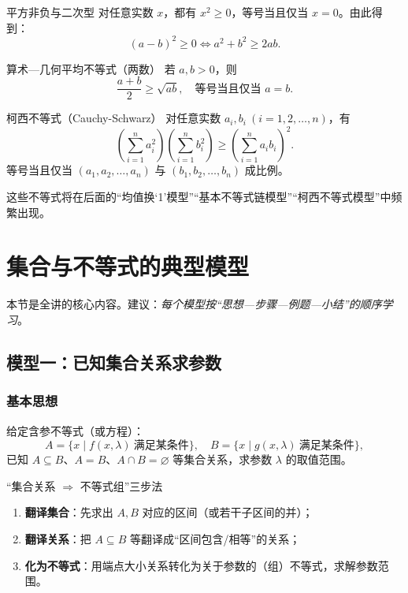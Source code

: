 \documentclass[a4paper,11pt]{ctexart}
\begin{document}
\begin{theorembox}{平方非负与二次型}
对任意实数 $x$，都有 $x^2\ge 0$，等号当且仅当 $x=0$。由此得到：
\[
(a-b)^2\ge 0\iff a^2+b^2\ge 2ab.
\]
\end{theorembox}

\begin{theorembox}{算术—几何平均不等式（两数）}
若 $a,b>0$，则
\[
\frac{a+b}{2}\ge\sqrt{ab},\quad
\text{等号当且仅当 } a=b.
\]
\end{theorembox}

\begin{theorembox}{柯西不等式（Cauchy-Schwarz）}
对任意实数 $a_i,b_i\ (i=1,2,\dots,n)$，有
\[
\left(\sum_{i=1}^n a_i^2\right)\left(\sum_{i=1}^n b_i^2\right)\ge
\left(\sum_{i=1}^n a_i b_i\right)^2.
\]
等号当且仅当 $(a_1,a_2,\dots,a_n)$ 与 $(b_1,b_2,\dots,b_n)$ 成比例。
\end{theorembox}

这些不等式将在后面的“均值换‘1’模型”“基本不等式链模型”“柯西不等式模型”中频繁出现。

\section{集合与不等式的典型模型}

本节是全讲的核心内容。建议：\emph{每个模型按“思想—步骤—例题—小结”的顺序学习}。

\subsection{模型一：已知集合关系求参数}

\subsubsection*{基本思想}

给定含参不等式（或方程）：
\[
A=\{x\mid f(x,\lambda)\ \text{满足某条件}\},\quad
B=\{x\mid g(x,\lambda)\ \text{满足某条件}\},
\]
已知 $A\subseteq B$、$A=B$、$A\cap B=\varnothing$ 等集合关系，求参数 $\lambda$ 的取值范围。

\begin{summarybox}{“集合关系 $\Longrightarrow$ 不等式组”三步法}
\begin{enumerate}
  \item \textbf{翻译集合}：先求出 $A,B$ 对应的区间（或若干子区间的并）；
  \item \textbf{翻译关系}：把 $A\subseteq B$ 等翻译成“区间包含/相等”的关系；
  \item \textbf{化为不等式}：用端点大小关系转化为关于参数的（组）不等式，求解参数范围。
\end{enumerate}
\end{summarybox}
\end{document}
